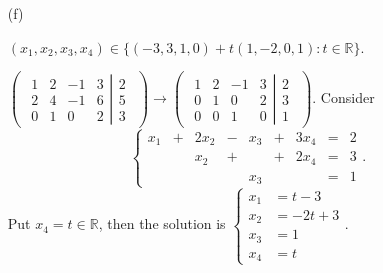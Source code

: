 \begin{Exercise}
\begin{enumerate}[(a)]
		\item[(f)]
		\begin{answer}
			$(x_1,x_2,x_3,x_4) \in \{(-3,3,1,0)+t(1,-2,0,1):t\in\mathbb{R}\}$.
		\end{answer}
		\begin{solution}
			$\begin{pmatrix} \left.\begin{matrix}
			1 & 2 & -1 & 3 \\
			2 & 4 & -1 & 6 \\
			0 & 1 & 0 & 2
			\end{matrix} \right| \begin{matrix}
			2 \\
			5 \\
			3
			\end{matrix} \end{pmatrix} \longrightarrow \begin{pmatrix} \left.\begin{matrix}
			1 & 2 & -1 & 3 \\
			0 & 1 & 0 & 2 \\
			0 & 0 & 1 & 0
			\end{matrix} \right| \begin{matrix}
			2 \\
			3 \\
			1
			\end{matrix} \end{pmatrix}$. Consider
			$$
			\left\{\begin{array}{rrrrrrrrrr}
			x_1 &+&2x_2&-&x_3 &+&3x_4 &=& 2 \\
			& &x_2&+& &+&2x_4 &=& 3 \\
			& & & &x_3 & & &=& 1
			\end{array}\right. .
			$$
			Put $x_4 = t\in\mathbb{R}$, then the solution is 
			$
			\left\{
			\begin{aligned}
			x_1 &= t-3 \\
			x_2 &= -2t+3 \\
			x_3 &= 1 \\
			x_4 &= t
			\end{aligned}\right.
			$.
			
		\end{solution}
		
	\end{enumerate}
\end{Exercise}